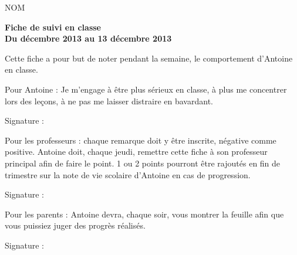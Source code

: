 \documentclass[a4paper,oneside,landscape,10pt]{article}
\begin{document}
\begin{minipage}{5cm}
NOM
\end{minipage}
\hfill
\begin{minipage}{5 cm}
\begin{center}
\textbf{Fiche de suivi en classe \\
Du  décembre 2013 au 13 décembre 2013}
\end{center}
\end{minipage}

\vspace{0.5cm}
Cette fiche a pour but de noter pendant la semaine, le comportement d'Antoine en classe.
\vspace{0.5cm}


\begin{minipage}{20cm}
Pour Antoine : Je m'engage à être plus sérieux en classe, à plus me concentrer lors des leçons, à ne pas me laisser distraire en bavardant.
\end{minipage}
\hfill
\begin{minipage}{3cm}
\begin{flushright}
Signature : 
\end{flushright}
\end{minipage}



\vspace{0.5cm}

\begin{minipage}{20cm}
Pour les professeurs : chaque remarque doit y être inscrite, négative comme positive.
Antoine doit, chaque jeudi, remettre cette fiche à son professeur principal afin de faire le point. 1 ou 2 points pourront être rajoutés en fin de trimestre sur la note de vie scolaire d'Antoine en cas de progression.
\end{minipage}
\hfill
\begin{minipage}{3cm}
\begin{flushright}
Signature : 

\end{flushright}
\end{minipage}
\vspace{0.5cm}

\begin{minipage}{20cm}
Pour les parents : Antoine devra, chaque soir, vous montrer la feuille afin que vous puissiez juger des progrès réalisés.
\end{minipage}
\hfill
\begin{minipage}{3cm}
\begin{flushright}
Signature : 
\end{flushright}
\end{minipage}
\vspace{0.5cm}
\end{document}
